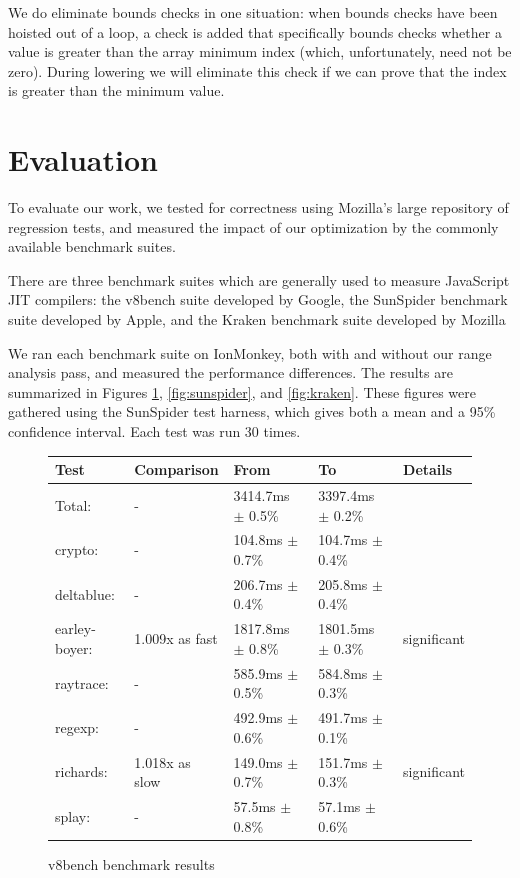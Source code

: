 \documentclass{article}
\begin{document}
We do eliminate bounds checks in one situation: when bounds checks
have been hoisted out of a loop, a check is added that specifically
bounds checks whether a value is greater than the array minimum index
(which, unfortunately, need not be zero). During lowering we will
eliminate this check if we can prove that the index is greater than
the minimum value.

\section{Evaluation}
To evaluate our work, we tested for correctness using Mozilla's large
repository of regression tests, and measured the impact of our
optimization by the commonly available benchmark suites.

There are three benchmark suites which are generally used to measure JavaScript
JIT compilers: the v8bench suite developed by Google\cite{v8bench}, the SunSpider benchmark
suite developed by Apple\cite{sunspider}, and the Kraken benchmark suite developed by Mozilla\cite{kraken}

We ran each benchmark suite on IonMonkey, both with and without our range
analysis pass, and measured the performance differences. The results are
summarized in Figures \ref{fig:v8bench}, \ref{fig:sunspider}, and
\ref{fig:kraken}. These figures were gathered using the SunSpider test harness,
which gives both a mean and a 95\% confidence interval\cite{sunspider}. Each
test was run 30 times.
\begin{figure}[H]
\begin{center}
\begin{tabular}{|l|l|l|l|l|}
\hline
    \textbf{Test}     &\textbf{Comparison} & \textbf{From}        & \textbf{To}           &  \textbf{Details} \\
\hline\hline
    Total:            &   -                & 3414.7ms $\pm$ 0.5\% &  3397.4ms $\pm$ 0.2\% & \\
\hline
\hline  crypto:       &   -                &  104.8ms $\pm$ 0.7\% &   104.7ms $\pm$ 0.4\% & \\
\hline  deltablue:    &   -                &  206.7ms $\pm$ 0.4\% &   205.8ms $\pm$ 0.4\% & \\
\hline  earley-boyer: &   1.009x as fast   & 1817.8ms $\pm$ 0.8\% &  1801.5ms $\pm$ 0.3\% &     significant \\
\hline  raytrace:     &   -                &  585.9ms $\pm$ 0.5\% &   584.8ms $\pm$ 0.3\% & \\
\hline  regexp:       &   -                &  492.9ms $\pm$ 0.6\% &   491.7ms $\pm$ 0.1\% & \\
\hline  richards:     &   1.018x as slow   &  149.0ms $\pm$ 0.7\% &   151.7ms $\pm$ 0.3\% &     significant \\
\hline  splay:        &   -                &   57.5ms $\pm$ 0.8\% &    57.1ms $\pm$ 0.6\% & \\
\hline
\end{tabular}
\caption{v8bench benchmark results}
\label{fig:v8bench}
\end{center}
\end{figure}
\end{document}
